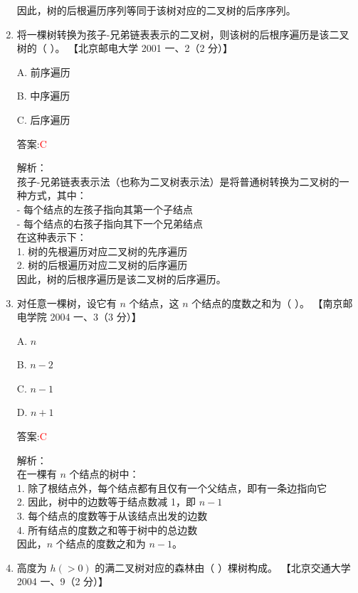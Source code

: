 \documentclass[lang=cn,newtx,10pt,scheme=chinese]{../../../elegantbook}
\begin{document}
\begin{enumerate}
    因此，树的后根遍历序列等同于该树对应的二叉树的后序序列。\\

    \item 将一棵树转换为孩子-兄弟链表表示的二叉树，则该树的后根序遍历是该二叉树的（ ）。  
    【北京邮电大学 2001 一、2（2 分）】  

    A. 前序遍历  

    B. 中序遍历  

    C. 后序遍历  

    答案:\textcolor{red}{C}
    
    解析：\\
    孩子-兄弟链表表示法（也称为二叉树表示法）是将普通树转换为二叉树的一种方式，其中：\\
    - 每个结点的左孩子指向其第一个子结点\\
    - 每个结点的右孩子指向其下一个兄弟结点\\
    
    在这种表示下：\\
    1. 树的先根遍历对应二叉树的先序遍历\\
    2. 树的后根遍历对应二叉树的后序遍历\\
    
    因此，树的后根序遍历是该二叉树的后序遍历。\\

    \item 对任意一棵树，设它有 $n$ 个结点，这 $n$ 个结点的度数之和为（ ）。  
    【南京邮电学院 2004 一、3（3 分）】  

    A. $n$  

    B. $n - 2$  

    C. $n - 1$  

    D. $n + 1$  

    答案:\textcolor{red}{C}
    
    解析：\\
    在一棵有 $n$ 个结点的树中：\\
    1. 除了根结点外，每个结点都有且仅有一个父结点，即有一条边指向它\\
    2. 因此，树中的边数等于结点数减 1，即 $n-1$\\
    3. 每个结点的度数等于从该结点出发的边数\\
    4. 所有结点的度数之和等于树中的总边数\\
    
    因此，$n$ 个结点的度数之和为 $n-1$。\\

    \item 高度为 $h (> 0)$ 的满二叉树对应的森林由（ ）棵树构成。  
    【北京交通大学 2004 一、9（2 分）】  


\end{enumerate}
\end{document}
